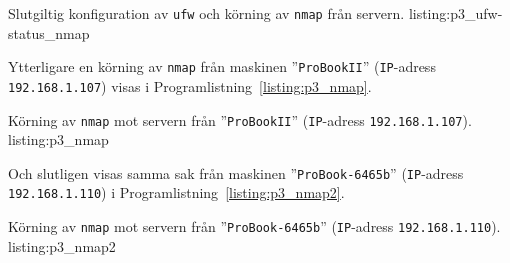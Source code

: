             {Slutgiltig konfiguration av \texttt{ufw} och körning av 
             \texttt{nmap} från servern.}
            {listing:p3_ufw-status_nmap}

Ytterligare en körning av \texttt{nmap} från maskinen ''\texttt{ProBookII}''
(\texttt{IP}-adress \texttt{192.168.1.107}) visas i
Programlistning~\ref{listing:p3_nmap}.

            {Körning av \texttt{nmap} mot servern från ''\texttt{ProBookII}''
             (\texttt{IP}-adress \texttt{192.168.1.107}).}
            {listing:p3_nmap}

Och slutligen visas samma sak från maskinen ''\texttt{ProBook-6465b}''
(\texttt{IP}-adress \texttt{192.168.1.110}) i
Programlistning~\ref{listing:p3_nmap2}.

            {Körning av \texttt{nmap} mot servern från ''\texttt{ProBook-6465b}''
             (\texttt{IP}-adress \texttt{192.168.1.110}).}
            {listing:p3_nmap2}
